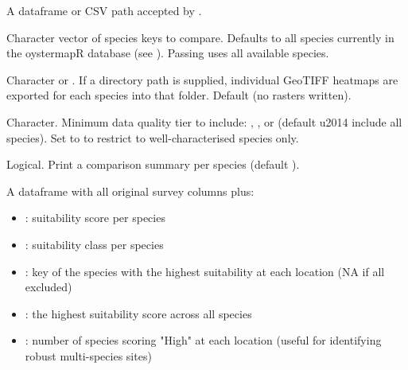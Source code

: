 \documentclass[a4paper]{book}
\begin{document}
\begin{Arguments}
\begin{ldescription}
\item[\code{data}] A dataframe or CSV path accepted by .

\item[\code{species}] Character vector of species keys to compare. Defaults to all
species currently in the oystermapR database (see ).
Passing  uses all available species.

\item[\code{output\_dir}] Character or . If a directory path is supplied,
individual GeoTIFF heatmaps are exported for each species into that folder.
Default  (no rasters written).

\item[\code{min\_data\_quality}] Character. Minimum data quality tier to include:
, , or  (default  \bsl{}u2014 include all species).
Set to  to restrict to well-characterised species only.

\item[\code{verbose}] Logical. Print a comparison summary per species (default ).
\end{ldescription}
\end{Arguments}
%
\begin{Value}
A dataframe with all original survey columns plus:
\begin{itemize}

\item{} : suitability score  per species
\item{} : suitability class per species
\item{} : key of the species with the highest suitability at each
location (NA if all excluded)
\item{} : the highest suitability score across all species
\item{} : number of species scoring "High" at each location
(useful for identifying robust multi-species sites)

\end{itemize}

\end{Value}
%
\end{document}
